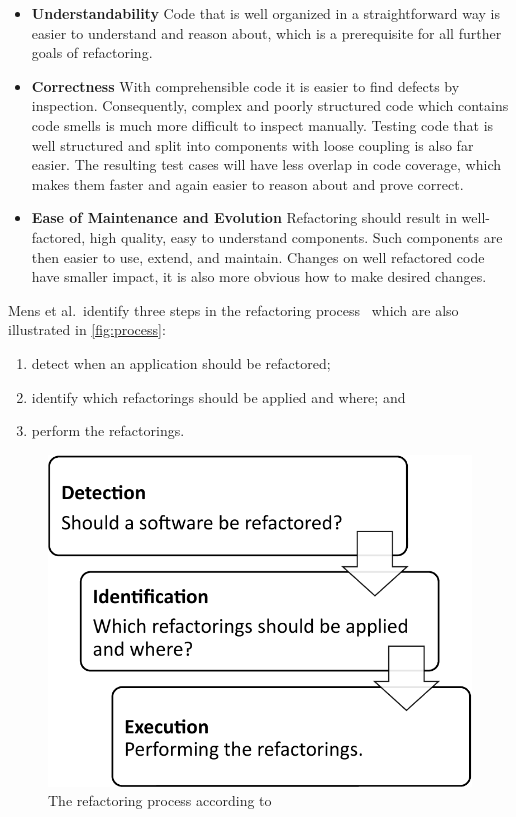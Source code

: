 \documentclass[conference,compsoc,a4paper]{IEEEtran}
\begin{document}
\begin{itemize}
  \item \textbf{Understandability}  Code that is well organized in a straightforward way is easier to understand and 
  reason about, which is a prerequisite for all further goals of refactoring.
  
  \item \textbf{Correctness}  With comprehensible code it is easier to find defects by inspection. Consequently, 
  complex and poorly structured code which contains code smells is much more difficult to inspect manually.
  Testing code that is well structured and split into components with loose coupling is also far easier. The resulting 
  test cases will have less overlap in code coverage, which makes them faster and again easier to reason about and 
  prove correct.
  
  \item \textbf{Ease of Maintenance and Evolution}  Refactoring should result in well-factored, high quality, easy to 
  understand components. Such components are then easier to use, extend, and maintain. Changes on well refactored code 
  have smaller impact, it is also more obvious how to make desired changes.
\end{itemize}

Mens et al.\ identify three steps in the refactoring process~\cite{DBLP:conf/iwpse/MensTM03} which are also illustrated 
in \autoref{fig:process}:
\begin{enumerate}
  \item detect when an application should be refactored;
  \item identify which refactorings should be applied and where; and
  \item perform the refactorings.
\end{enumerate}

\begin{figure}[htb]
  \centering
  \includegraphics[width=0.8\linewidth]{figures/process}
  \caption{The refactoring process according to \cite{DBLP:conf/iwpse/MensTM03}}
  \label{fig:process}
\end{figure}
\end{document}
